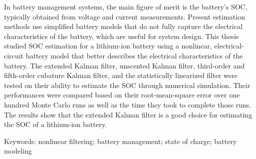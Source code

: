 In battery management systems, the main figure of merit is the battery's SOC, typically obtained from voltage and current measurements.
Present estimation methods use simplified battery models that do not fully capture the electrical characteristics of the battery, which are useful for system design.
This thesis studied SOC estimation for a lithium-ion battery using a nonlinear, electrical-circuit battery model that better describes the electrical characteristics of the battery.
The extended Kalman filter, unscented Kalman filter, third-order and fifth-order cubature Kalman filter, and the statistically linearized filter were tested on their ability to estimate the SOC through numerical simulation.
Their performances were compared based on their root-mean-square error over one hundred Monte Carlo runs as well as the time they took to complete those runs.
The results show that the extended Kalman filter is a good choice for estimating the SOC of a lithium-ion battery.

\vfill

\noindent Keywords: nonlinear filtering; battery management; state of charge; battery modeling
